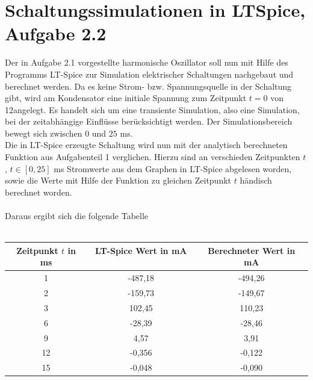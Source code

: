 \section*{Schaltungssimulationen in LTSpice, Aufgabe 2.2}\label{sec:ag2.2}
Der in Aufgabe 2.1 vorgestellte harmonische Oszillator soll nun mit Hilfe des Programms \glqq LT-Spice\grqq{} zur Simulation elektrischer Schaltungen nachgebaut und berechnet werden. Da es keine Strom- bzw. Spannungsquelle in der Schaltung gibt, wird am Kondensator eine initiale Spannung zum Zeitpunkt $t = 0$ von 12\volt angelegt. Es handelt sich um eine transiente Simulation, also eine Simulation, bei der zeitabhängige Einflüsse berücksichtigt werden. Der Simulationsbereich bewegt sich zwischen $0$ und $25$ \si{\milli\second}. \\
Die in LT-Spice erzeugte Schaltung wird nun mit der analytisch berechneten Funktion aus Aufgabenteil 1 verglichen. Hierzu sind an verschieden Zeitpunkten $t$ , $t \in [0,25]$ \si{\milli\second} Stromwerte aus dem Graphen in LT-Spice abgelesen worden, sowie die Werte mit Hilfe der Funktion zu gleichen Zeitpunkt $t$ händisch berechnet worden.\\ \\
Daraus ergibt sich die folgende Tabelle\\ \\
\begin{table}[h]
	\centering
	\begin{tabular}[h]{c|c|c}
		Zeitpunkt $t$ in \si{\milli\second} & LT-Spice Wert in \si{\milli\ampere} \ & Berechneter Wert in \si{\milli\ampere} \\
		\hline
		1 & -487,18 & -494,26 \\
		2 & -159,73 & -149,67\\
		3 & 102,45 & 110,23\\
		6 & -28,39 & -28,46\\
		9 & 4,57 & 3,91\\
		12 & -0,356 & -0,122\\
		15 & -0,048 & -0,090\\
	\end{tabular}
\end{table}\\
\\

